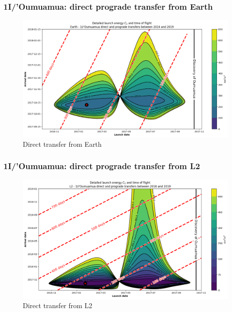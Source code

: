 \documentclass[xcolor={dvipsnames}]{beamer}
\begin{document}
\begin{frame}
\frametitle{1I/'Oumuamua: direct prograde transfer from Earth}

\begin{figure}[h]
    \centering
    \includegraphics[width=\textwidth]{fig/static/oumuamua/direct-detailed-porkchop-tof.png}
    \caption{Direct transfer from Earth}
    \label{fig:oumuamua-earth-transfer}
\end{figure}

\end{frame}

\begin{frame}
\frametitle{1I/'Oumuamua: direct prograde transfer from L2}

\begin{figure}[h]
    \centering
    \includegraphics[width=\textwidth]{fig/static/oumuamua/l2-direct-detailed-porkchop-tof.png}
    \caption{Direct transfer from L2}
    \label{fig:oumuamua-l2-transfer}
\end{figure}

\end{frame}
\end{document}
